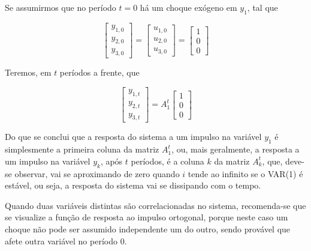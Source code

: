 \documentclass[a4paper,
               article,
               12pt,
               openany,
               oneside,
               english,
               brazil]{abntex2}
\numberwithin{equation}{section}
\begin{document}
    Se assumirmos que no período $ t = 0 $ há um choque exógeno em $ y_1 $, tal que

    \begin{equation*}
        \label{impulse-response}
        \begin{bmatrix}
            y_{1,0} \\
            y_{2,0} \\
            y_{3,0}
        \end{bmatrix} =
        \begin{bmatrix}
            u_{1,0} \\
            u_{2,0} \\
            u_{3,0}
        \end{bmatrix} =
        \begin{bmatrix}
            1 \\
            0 \\
            0
        \end{bmatrix}
    \end{equation*}

    Teremos, em $ t $ períodos a frente, que

    \begin{equation*}
        \label{impulse-response}
        \begin{bmatrix}
            y_{1,t} \\
            y_{2,t} \\
            y_{3,t}
        \end{bmatrix} =
        A_1^{t}
        \begin{bmatrix}
            1 \\
            0 \\
            0
        \end{bmatrix}
    \end{equation*}

    Do que se conclui que a resposta do sistema a um impulso na variável $ y_1 $ é simplesmente a primeira coluna da matriz $ A_1^{t} $, ou, mais geralmente, a resposta a um impulso na variável $ y_k $, após $ t $ períodos, é a coluna $ k $ da matriz $ A_k^{t} $, que, deve-se observar, vai se aproximando de zero quando $ i $ tende ao infinito se o VAR(1) é estável, ou seja, a resposta do sistema vai se dissipando com o tempo.

   Quando duas variáveis distintas são correlacionadas no sistema, recomenda-se que se visualize a função de resposta ao impulso ortogonal, porque neste caso um choque não pode ser assumido independente um do outro, sendo provável que afete outra variável no período $ 0 $.
\end{document}
